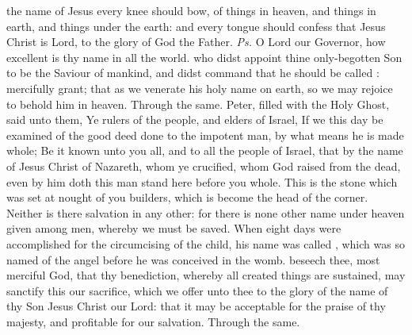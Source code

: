 


\introit
{} the name of Jesus every knee should bow, of things in heaven, and things in earth, and things under the earth: and every tongue should confess that Jesus Christ is Lord, to the glory of God the Father. \textit{Ps.} O Lord our Governor, how excellent is thy name in all the world.
\collect
{} who didst appoint thine only-begotten Son to be the Saviour of mankind, and didst command that he should be called : mercifully grant; that as we venerate his holy name on earth, so we may rejoice to behold him in heaven. Through the same.
 Peter, filled with the Holy Ghost, said unto them, Ye rulers of the people, and elders of Israel, If we this day be examined of the good deed done to the impotent man, by what means he is made whole; Be it known unto you all, and to all the people of Israel, that by the name of Jesus Christ of Nazareth, whom ye crucified, whom God raised from the dead, even by him doth this man stand here before you whole. This is the stone which was set at nought of you builders, which is become the head of the corner. Neither is there salvation in any other: for there is none other name under heaven given among men, whereby we must be saved.
 When eight days were accomplished for the circumcising of the child, his name was called , which was so named of the angel before he was conceived in the womb.
\secret
{} beseech thee, most merciful God, that thy benediction, whereby all created things are sustained, may sanctify this our sacrifice, which we offer unto thee to the glory of the name of thy Son Jesus Christ our Lord: that it may be acceptable for the praise of thy majesty, and profitable for our salvation. Through the same.
